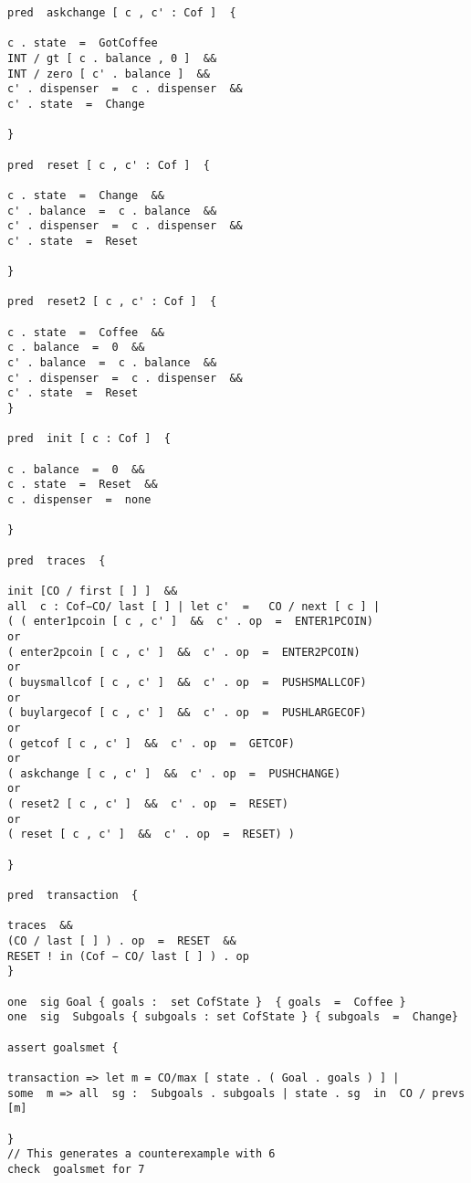 \documentclass[a4paper,12pt]{extarticle}
\begin{document}
\begin{verbatim}
pred  askchange [ c , c' : Cof ]  {

c . state  =  GotCoffee
INT / gt [ c . balance , 0 ]  &&
INT / zero [ c' . balance ]  &&
c' . dispenser  =  c . dispenser  &&
c' . state  =  Change

}

pred  reset [ c , c' : Cof ]  {

c . state  =  Change  &&
c' . balance  =  c . balance  &&
c' . dispenser  =  c . dispenser  &&
c' . state  =  Reset

}

pred  reset2 [ c , c' : Cof ]  {

c . state  =  Coffee  &&
c . balance  =  0  &&
c' . balance  =  c . balance  &&
c' . dispenser  =  c . dispenser  &&
c' . state  =  Reset
}

pred  init [ c : Cof ]  {

c . balance  =  0  &&
c . state  =  Reset  &&
c . dispenser  =  none

}

pred  traces  {

init [CO / first [ ] ]  &&
all  c : Cof−CO/ last [ ] | let c'  =   CO / next [ c ] |
( ( enter1pcoin [ c , c' ]  &&  c' . op  =  ENTER1PCOIN)
or
( enter2pcoin [ c , c' ]  &&  c' . op  =  ENTER2PCOIN)
or
( buysmallcof [ c , c' ]  &&  c' . op  =  PUSHSMALLCOF)
or
( buylargecof [ c , c' ]  &&  c' . op  =  PUSHLARGECOF)
or
( getcof [ c , c' ]  &&  c' . op  =  GETCOF)
or
( askchange [ c , c' ]  &&  c' . op  =  PUSHCHANGE)
or
( reset2 [ c , c' ]  &&  c' . op  =  RESET)
or
( reset [ c , c' ]  &&  c' . op  =  RESET) )

}

pred  transaction  {

traces  &&
(CO / last [ ] ) . op  =  RESET  &&
RESET ! in (Cof − CO/ last [ ] ) . op
}

one  sig Goal { goals :  set CofState }  { goals  =  Coffee }
one  sig  Subgoals { subgoals : set CofState } { subgoals  =  Change}

assert goalsmet {

transaction => let m = CO/max [ state . ( Goal . goals ) ] |
some  m => all  sg :  Subgoals . subgoals | state . sg  in  CO / prevs [m]

}
// This generates a counterexample with 6
check  goalsmet for 7

\end{verbatim}
\end{document}
